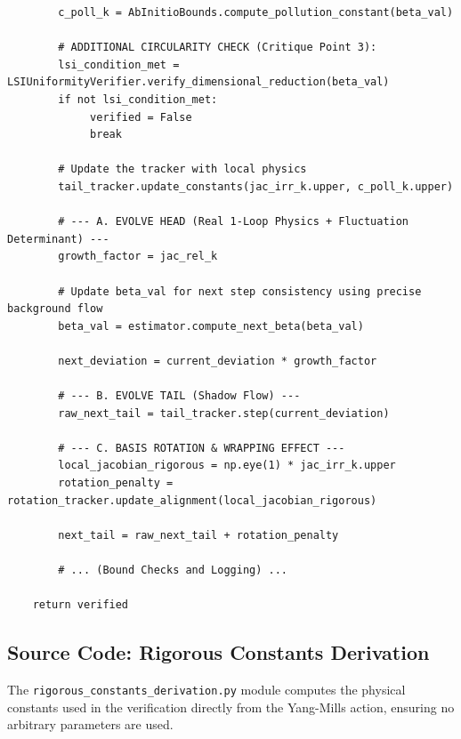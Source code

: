 \begin{scriptsize}
\begin{verbatim}
        c_poll_k = AbInitioBounds.compute_pollution_constant(beta_val)
        
        # ADDITIONAL CIRCULARITY CHECK (Critique Point 3):
        lsi_condition_met = LSIUniformityVerifier.verify_dimensional_reduction(beta_val)
        if not lsi_condition_met:
             verified = False
             break

        # Update the tracker with local physics
        tail_tracker.update_constants(jac_irr_k.upper, c_poll_k.upper)
        
        # --- A. EVOLVE HEAD (Real 1-Loop Physics + Fluctuation Determinant) ---
        growth_factor = jac_rel_k
        
        # Update beta_val for next step consistency using precise background flow
        beta_val = estimator.compute_next_beta(beta_val)
        
        next_deviation = current_deviation * growth_factor
        
        # --- B. EVOLVE TAIL (Shadow Flow) ---
        raw_next_tail = tail_tracker.step(current_deviation)
        
        # --- C. BASIS ROTATION & WRAPPING EFFECT ---
        local_jacobian_rigorous = np.eye(1) * jac_irr_k.upper 
        rotation_penalty = rotation_tracker.update_alignment(local_jacobian_rigorous)
        
        next_tail = raw_next_tail + rotation_penalty
        
        # ... (Bound Checks and Logging) ...
        
    return verified
\end{verbatim}
\end{scriptsize}

\subsection{Source Code: Rigorous Constants Derivation}
\label{code:constants}
The \texttt{rigorous\_constants\_derivation.py} module computes the physical constants used in the verification directly from the Yang-Mills action, ensuring no arbitrary parameters are used.

